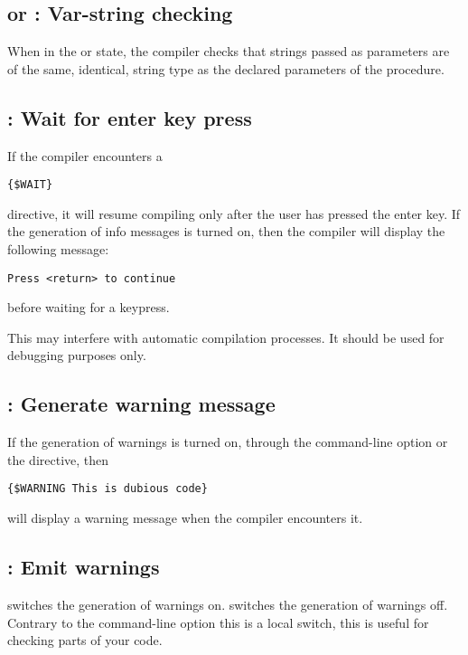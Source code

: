 \subsection{ or  : Var-string checking}

When in the \var{+} or  state, the compiler checks that strings
passed as parameters are of the same, identical, string type as the declared
parameters of the procedure.

\subsection{ : Wait for enter key press}

If the compiler encounters a
\begin{verbatim}
{$WAIT}
\end{verbatim}
directive, it will resume compiling only after the user has pressed the
enter key. If the generation of info messages is turned on, then the compiler
will display the following message:
\begin{verbatim}
Press <return> to continue
\end{verbatim}
before waiting for a keypress.
\begin{remark}This may interfere with automatic
compilation processes. It should be used for debugging purposes only.
\end{remark}

\subsection{ : Generate warning message}

If the generation of warnings is turned on, through the 
command-line option or the  directive, then
\begin{verbatim}
{$WARNING This is dubious code}
\end{verbatim}
will display a warning message when the compiler encounters it.

\subsection{ : Emit warnings}

 switches the generation of warnings on.
 switches the generation of warnings off.
Contrary to the command-line option  this
is a local switch, this is useful for checking parts of your code.

